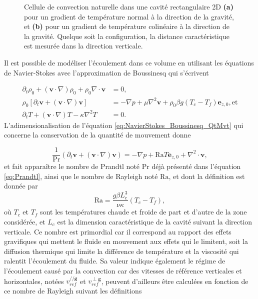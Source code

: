 \begin{figure}[!ht]
    \centering
    
    \caption{Cellule de convection naturelle dans une cavité rectangulaire 2D \textbf{(a)} pour un gradient de température normal à la direction de la gravité, et \textbf{(b)} pour un gradient de température colinéaire à la direction de la gravité. Quelque soit la configuration, la distance caractéristique est mesurée dans la direction verticale.}
    \label{fig:SimuConvNat2D}
\end{figure}



Il est possible de modéliser l'écoulement dans ce volume en utilisant les équations de Navier-Stokes avec l'approximation de Boussinesq qui s'écrivent

\begin{subequations} %
	\begin{align}
		\partial_t \rho_0 + (\mathbf v \cdot \nabla)\rho_0 + \rho_0 \nabla \cdot \mathbf{v} &= 0, \label{eq:NavierStokes_Boussinesq_Conti}\\
		\rho_0 [\partial_t \mathbf v + (\mathbf v \cdot \nabla)\mathbf v] &= -\nabla p + \mu \nabla^2 \mathbf v + \rho_0\beta g(T_c-T_f) \mathbf e_{z,0}, \text{et}\label{eq:NavierStokes_Boussinesq_QtMvt}\\
		\partial_t T + (\mathbf v \cdot \nabla) T - \kappa\nabla^2T &= 0. \label{eq:NavierStokes_Boussinesq_NRJinterne}
	\end{align}
	\label{eq:NavierStokes_Boussinesq}%
\end{subequations}
L'adimensionalisation de l'équation \eqref{eq:NavierStokes_Boussinesq_QtMvt} qui concerne la conservation de la quantité de mouvement donne

\begin{equation}
	\frac{1}{\mathrm{Pr}}(\partial_t \mathbf{v} + (\mathbf{v} \cdot \nabla)\mathbf{v}) = -\nabla p + \mathrm{Ra} T \mathbf e_{z,0} + \nabla^2 \cdot \mathbf{v},
	\label{eq:NonDim_NavierStokes_Boussinesq_QtMvt}
\end{equation}
et fait apparaître le nombre de Prandtl noté $\mathrm{Pr}$ déjà présenté dans l'équation \eqref{eq:Prandtl}, ainsi que le nombre de Rayleigh noté $\mathrm{Ra}$, et dont la définition est donnée par 
\begin{equation}
	\mathrm{Ra} = \frac{g \beta L_c^3}{\nu \kappa} (T_c-T_f),
	\label{eq:NbrRayleigh}
\end{equation}
où $T_c$ et $T_f$ sont les températures chaude et froide de part et d'autre de la zone considérée, et $L_c$ est la dimension caractéristique de la cavité suivant la direction verticale. Ce nombre est primordial car il correspond au rapport des effets gravifiques qui mettent le fluide en mouvement aux effets qui le limitent, soit la diffusion thermique qui limite la différence de température et la viscosité qui ralentit l'écoulement du fluide. Sa valeur indique également le régime de l'écoulement causé par la convection car des vitesses de référence verticales et horizontales, notées $v_{ref}^{// \mathbf g}$ et $v_{ref}^{\perp \mathbf g}$, peuvent d'ailleurs être calculées en fonction de ce nombre de Rayleigh suivant les définitions

